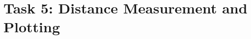 \documentclass[15pt, a4paper, oneside]{report}
\begin{document}
\newpage


\normalfont

\vspace*{5mm}

\section*{\Large Task 5: Distance Measurement and Plotting}

\vspace{2mm}
    \Large

    
    
    
    
    
  
\vspace{1cm}
\end{document}

